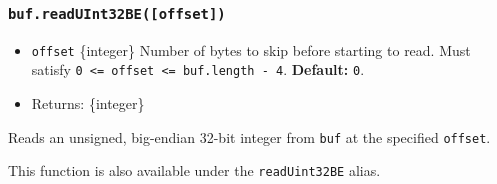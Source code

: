 \subsubsection{\texorpdfstring{\texttt{buf.readUInt32BE({[}offset{]})}}{buf.readUInt32BE({[}offset{]})}}\label{buf.readuint32beoffset}

\begin{itemize}
\tightlist
\item
  \texttt{offset} \{integer\} Number of bytes to skip before starting to
  read. Must satisfy
  \texttt{0\ \textless{}=\ offset\ \textless{}=\ buf.length\ -\ 4}.
  \textbf{Default:} \texttt{0}.
\item
  Returns: \{integer\}
\end{itemize}

Reads an unsigned, big-endian 32-bit integer from \texttt{buf} at the
specified \texttt{offset}.

This function is also available under the \texttt{readUint32BE} alias.

\begin{Shaded}
\begin{Highlighting}[]
\NormalTok{ \{ }\NormalTok{ \} } \OperatorTok{;}

\OperatorTok{=} \NormalTok{([}\OperatorTok{,} \OperatorTok{,} \OperatorTok{,} \NormalTok{])}\OperatorTok{;}

\NormalTok{(}\NormalTok{)}\NormalTok{(}\NormalTok{))}\OperatorTok{;}
\end{Highlighting}
\end{Shaded}

\begin{Shaded}
\begin{Highlighting}[]
\NormalTok{ \{ }\NormalTok{ \} }\OperatorTok{=} \NormalTok{(}\NormalTok{)}\OperatorTok{;}

\OperatorTok{=} \NormalTok{([}\OperatorTok{,} \OperatorTok{,} \OperatorTok{,} \NormalTok{])}\OperatorTok{;}

\NormalTok{(}\NormalTok{)}\NormalTok{(}\NormalTok{))}\OperatorTok{;}
\end{Highlighting}
\end{Shaded}

